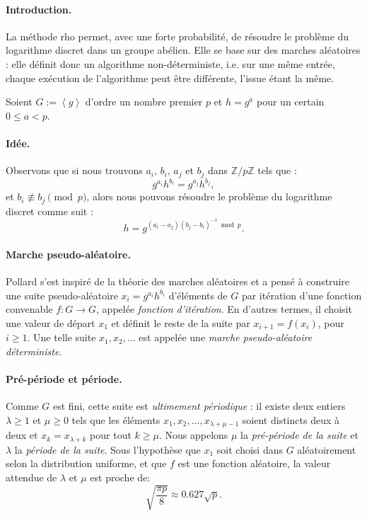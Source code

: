 \documentclass[a4paper, titlepage, 11pt]{article}
\theoremstyle{definition}
\theoremstyle{remark}
\def\Z{\mathbb Z}
\def\gen #1{\left\langle#1\right\rangle}
\begin{document}
\paragraph{Introduction.}La méthode rho permet, avec une forte probabilité, de résoudre le problème du logarithme discret dans un groupe abélien. Elle se base sur des marches aléatoires : elle définit donc un algorithme non-déterministe, i.e. sur une même entrée, chaque exécution de l'algorithme peut être différente, l'issue étant la même.

 Soient $G := \gen{g}$ d'ordre un nombre premier $p$ et $h = g^a$ pour un certain $0 \leqslant a < p$.

\paragraph{Idée.} Observons que si nous trouvons $a_i$, $b_i$, $a_j$ et $b_j$ dans $\Z/p\Z$ tels que :
$$ g^{a_i}h^{b_i} = g^{a_j}h^{b_j},$$
et $b_i \not\equiv b_j \pmod{p}$, alors nous pouvons résoudre le problème du logarithme discret comme suit : $$h = g^{(a_i-a_j)(b_j-b_i)^{-1}\bmod{p}}.$$

\paragraph{Marche pseudo-aléatoire.} Pollard \cite{pollard1978} s'est inspiré de la théorie des marches aléatoires et a pensé à construire une suite pseudo-aléatoire $x_i = g^{a_i}h^{b_i}$ d'éléments de $G$ par itération d'une fonction convenable $f:G \rightarrow  G$, appelée \textit{fonction d'itération}. En d'autres termes, il choisit une valeur de départ $x_1$ et définit le reste de la suite par $x_{i+1}=f({x_i})$, pour $i \geqslant 1$. Une telle suite $x_1, x_2, \dots$ est appelée une \textit{marche pseudo-aléatoire déterministe}.

\paragraph{Pré-période et période.}Comme $G$ est fini, cette suite est \textit{ultimement périodique} : il existe deux entiers $\lambda \geqslant 1$ et $\mu \geqslant 0$ tels que les éléments $x_1, x_2, \dots, x_{\lambda + \mu -1}$ soient distincts deux à deux et $x_{k} = x_{\lambda + k}$ pour tout $k\geqslant \mu$. Nous appelons $\mu$ la \textit{pré-période de la suite} et $\lambda$ la \textit{période de la suite}. Sous l'hypothèse que $x_1$ soit choisi dans $G$ aléatoirement selon la distribution uniforme, et que $f$ est une fonction aléatoire, la valeur attendue de $\lambda$ et $\mu$ est proche de:
$$\sqrt{\frac{\pi p}{8}} \approx 0.627 \sqrt{p}.$$
\end{document}
